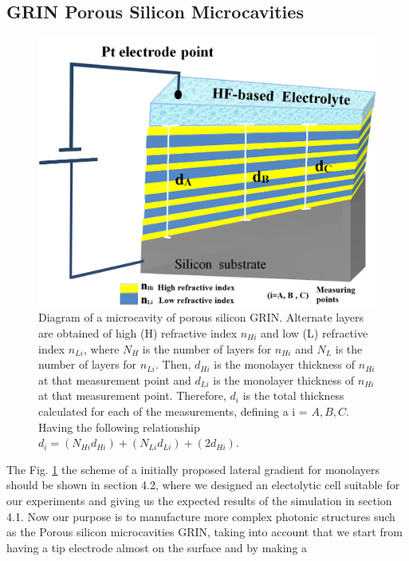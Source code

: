 \documentclass{article}
\begin{document}
\subsection{GRIN Porous Silicon Microcavities}
\label{sec:grin-porous-silicon}
\begin{figure}
	\centering
	\includegraphics[width=\textwidth]{Images/MicrGrin}
	\caption{Diagram of a microcavity of porous silicon
            GRIN. Alternate layers are obtained of high (H) refractive
            index $n_{Hi}$ and low (L) refractive index
            $n_{Li}$, where $N_H$ is the number of layers for
            $n_{Hi}$ and $N_L$ is the number of layers for
            $n_{Li}$. Then,  $d_{Hi}$ is the monolayer thickness
            of  $n_{Hi}$ at that measurement point and $d_{Li}$
            is the monolayer thickness of $n_{Hi}$ at that
            measurement point. Therefore,  $d_i$ is the total
            thickness calculated for each of the measurements,
            defining a i = $ A, B, C$. Having the following
            relationship $d_i =(N_{Hi}d_{Hi})+(N_{Li}d_{Li}) +
            (2d_{Hi})$. }
	\label{fig:MCGRIN0}
\end{figure}
The Fig. \ref{fig:MCGRIN0} the scheme of  a initially proposed lateral
gradient for monolayers should be shown in section 4.2, where we
designed an electolytic cell suitable for our experiments and giving
us the expected results of the simulation in section 4.1. Now our
purpose is to manufacture more complex photonic structures such as the
Porous silicon microcavities GRIN, taking into account that we start
from having a tip electrode almost on the surface and by making a
\end{document}
